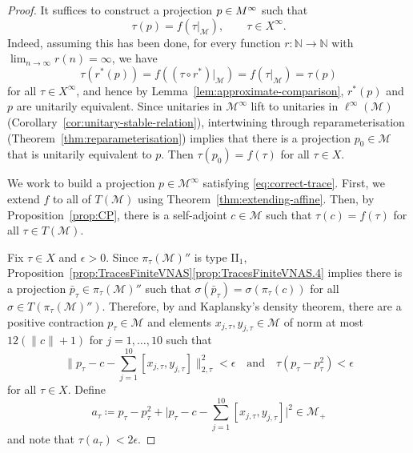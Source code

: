 \documentclass[a4paper,11pt]{amsart}
\theoremstyle{definition}
\numberwithin{equation}{section}
\numberwithin{theorem}{section}
\newcommand{\M}{\mathcal{M}}
\begin{document}
\begin{proof}
	It suffices to construct a projection $p \in \mathcal \M^\infty$ such that \begin{equation}\label{eq:correct-trace}
		\tau(p) = f(\tau|_\M), \qquad \tau \in X^\infty.
	\end{equation}
	Indeed, assuming this has been done, for every function $r \colon \mathbb N \rightarrow \mathbb N$ with $\lim_{n \rightarrow \infty} r(n) = \infty$, we have
	\begin{equation}
		\tau(r^*(p)) = f((\tau \circ r^*)|_\M) = f(\tau|_{\M}) = \tau(p)
	\end{equation}
	for all $\tau \in X^\infty$, and hence by Lemma~\ref{lem:approximate-comparison}, $r^*(p)$ and $p$ are unitarily equivalent.  Since unitaries in $\M^\infty$ lift to unitaries in $\ell^\infty(\M)$ (Corollary~\ref{cor:unitary-stable-relation}), intertwining through reparameterisation (Theorem~\ref{thm:reparameterisation}) implies that there is a projection $p_0 \in \mathcal M$ that is unitarily equivalent to $p$.  Then $\tau(p_0) = f(\tau)$ for all $\tau \in X$.
	
	We work to build a projection $p \in \mathcal M^\infty$ satisfying \eqref{eq:correct-trace}.  First, we extend $f$ to all of $T(\M)$ using Theorem~\ref{thm:extending-affine}. Then, by Proposition~\ref{prop:CP}, there is a self-adjoint $c \in \M$ such that $\tau(c) = f(\tau)$ for all $\tau \in T(\M)$. 
	
	Fix $\tau \in X$ and $\epsilon>0$. Since $\pi_\tau(\M)''$ is type II$_1$, Proposition~\ref{prop:TracesFiniteVNAS}\ref{prop:TracesFiniteVNAS.4} implies there is a projection $\bar{p}_\tau \in \pi_\tau(\M)''$ such that $\sigma(\bar{p}_\tau) = \sigma(\pi_\tau(c))$ for all $\sigma \in T(\pi_\tau(\M)'')$.  Therefore, by \cite[Th\'eor\`eme~3.2]{FH80} and Kaplansky's density theorem, there are a positive contraction $p_\tau \in \M$ and elements $x_{j, \tau}, y_{j, \tau} \in \M$ of norm at most $12(\|c\| + 1)$ for $j = 1, \ldots, 10$ such that
	\begin{equation}
		\Big\| p_\tau - c - \sum_{j=1}^{10} [ x_{j, \tau}, y_{j, \tau} ] \Big\|^2_{2, \tau} < \epsilon \quad \text{and} \quad \tau(p_\tau - p_\tau^2) < \epsilon
	\end{equation}
	for all $\tau \in X$.
	Define
	\begin{equation}
		a_\tau \coloneqq p_\tau - p_\tau^2 + \Big| p_\tau - c - \sum_{j=1}^{10} [ x_{j, \tau}, y_{j, \tau} ] \Big|^2 \in \mathcal M_+
	\end{equation}
	and note that $\tau(a_\tau) < 2\epsilon$.  
	

\end{proof}
\end{document}
